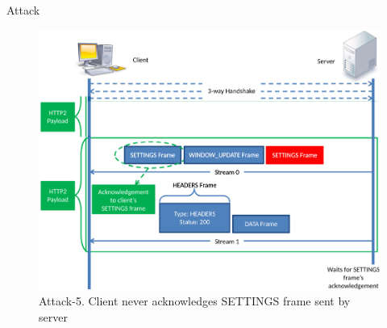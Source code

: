 \documentclass{beamer}
\begin{document}
\begin{frame}{Attack }
  \begin{figure}[t]
    \includegraphics[scale=0.27]{images/attack5_short.png}
    \caption{Attack-5. Client never acknowledges SETTINGS frame sent by server}
  \end{figure}
\end{frame}
\end{document}
